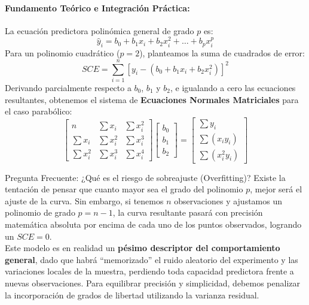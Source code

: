 \documentclass[11pt,letterpaper]{article}
\begin{document}
\paragraph{Fundamento Teórico e Integración Práctica:}
La ecuación predictora polinómica general de grado $p$ es:
\begin{equation}
    \hat{y}_i = b_0 + b_1 x_i + b_2 x_i^2 + \dots + b_p x_i^p
\end{equation}
Para un polinomio cuadrático ($p = 2$), planteamos la suma de cuadrados de error:
\begin{equation}
    SCE = \sum_{i=1}^n [y_i - (b_0 + b_1 x_i + b_2 x_i^2)]^2
\end{equation}
Derivando parcialmente respecto a $b_0$, $b_1$ y $b_2$, e igualando a cero las ecuaciones resultantes, obtenemos el sistema de \textbf{Ecuaciones Normales Matriciales} para el caso parabólico:
\begin{equation}
    \begin{bmatrix}
        n & \sum x_i & \sum x_i^2 \\
        \sum x_i & \sum x_i^2 & \sum x_i^3 \\
        \sum x_i^2 & \sum x_i^3 & \sum x_i^4
    \end{bmatrix}
    \begin{bmatrix}
        b_0 \\ b_1 \\ b_2
    \end{bmatrix} =
    \begin{bmatrix}
        \sum y_i \\
        \sum (x_i y_i) \\
        \sum (x_i^2 y_i)
    \end{bmatrix}
\end{equation}

\begin{alertaBox}{Pregunta Frecuente: ¿Qué es el riesgo de sobreajuste (Overfitting)?}
Existe la tentación de pensar que cuanto mayor sea el grado del polinomio $p$, mejor será el ajuste de la curva. Sin embargo, si tenemos $n$ observaciones y ajustamos un polinomio de grado $p = n-1$, la curva resultante pasará con precisión matemática absoluta por encima de cada uno de los puntos observados, logrando un $SCE = 0$. \\
Este modelo es en realidad un \textbf{pésimo descriptor del comportamiento general}, dado que habrá ``memorizado'' el ruido aleatorio del experimento y las variaciones locales de la muestra, perdiendo toda capacidad predictora frente a nuevas observaciones. Para equilibrar precisión y simplicidad, debemos penalizar la incorporación de grados de libertad utilizando la varianza residual.
\end{alertaBox}
\end{document}
